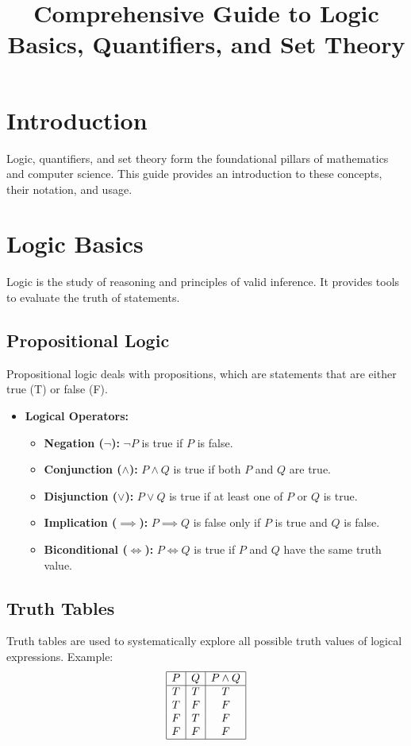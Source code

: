 \documentclass[a4paper,12pt]{article}
\title{Comprehensive Guide to Logic Basics, Quantifiers, and Set Theory}
\author{}
\date{}
\begin{document}
\maketitle

\tableofcontents

\section{Introduction}
Logic, quantifiers, and set theory form the foundational pillars of mathematics and computer science. This guide provides an introduction to these concepts, their notation, and usage.

\section{Logic Basics}
Logic is the study of reasoning and principles of valid inference. It provides tools to evaluate the truth of statements.

\subsection{Propositional Logic}
Propositional logic deals with propositions, which are statements that are either true (T) or false (F).
\begin{itemize}
    \item \textbf{Logical Operators:}
    \begin{itemize}
        \item \textbf{Negation (\(\neg\)):} \(\neg P\) is true if \(P\) is false.
        \item \textbf{Conjunction (\(\land\)):} \(P \land Q\) is true if both \(P\) and \(Q\) are true.
        \item \textbf{Disjunction (\(\lor\)):} \(P \lor Q\) is true if at least one of \(P\) or \(Q\) is true.
        \item \textbf{Implication (\(\implies\)):} \(P \implies Q\) is false only if \(P\) is true and \(Q\) is false.
        \item \textbf{Biconditional (\(\iff\)):} \(P \iff Q\) is true if \(P\) and \(Q\) have the same truth value.
    \end{itemize}
\end{itemize}

\subsection{Truth Tables}
Truth tables are used to systematically explore all possible truth values of logical expressions. Example:
\[
\begin{array}{|c|c|c|}
\hline
P & Q & P \land Q \\
\hline
T & T & T \\
T & F & F \\
F & T & F \\
F & F & F \\
\hline
\end{array}
\]
\end{document}
